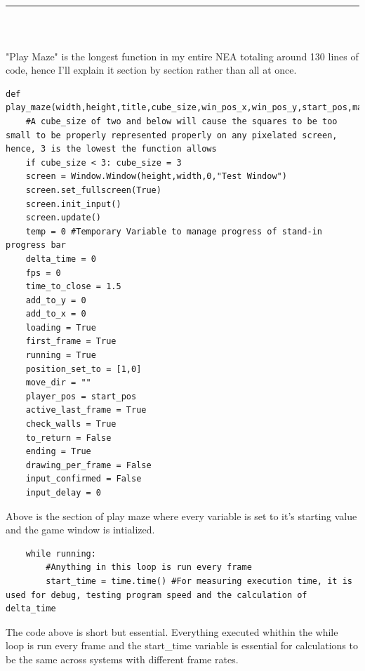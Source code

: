 \textcolor[RGB]{220,220,220}{\rule{\linewidth}{0.2pt}}
\\
\begin{lstlisting}
\end{lstlisting}
"Play Maze" is the longest function in my entire NEA totaling around 130 lines of code, hence I'll explain it section by section rather than all at once.
\begin{lstlisting}
def play_maze(width,height,title,cube_size,win_pos_x,win_pos_y,start_pos,maze_data):
    #A cube_size of two and below will cause the squares to be too small to be properly represented properly on any pixelated screen, hence, 3 is the lowest the function allows
    if cube_size < 3: cube_size = 3 
    screen = Window.Window(height,width,0,"Test Window")
    screen.set_fullscreen(True)
    screen.init_input()
    screen.update()
    temp = 0 #Temporary Variable to manage progress of stand-in progress bar
    delta_time = 0
    fps = 0
    time_to_close = 1.5
    add_to_y = 0
    add_to_x = 0
    loading = True
    first_frame = True
    running = True
    position_set_to = [1,0]
    move_dir = ""
    player_pos = start_pos
    active_last_frame = True
    check_walls = True
    to_return = False
    ending = True
    drawing_per_frame = False
    input_confirmed = False
    input_delay = 0
\end{lstlisting}
Above is the section of play maze where every variable is set to it's starting value and the game window is intialized.

\begin{lstlisting}
    while running:
        #Anything in this loop is run every frame
        start_time = time.time() #For measuring execution time, it is used for debug, testing program speed and the calculation of delta_time        
\end{lstlisting}
The code above is short but essential. Everything executed whithin the while loop is run every frame and the start\_time variable is essential for calculations to be the same across systems with different frame rates.


